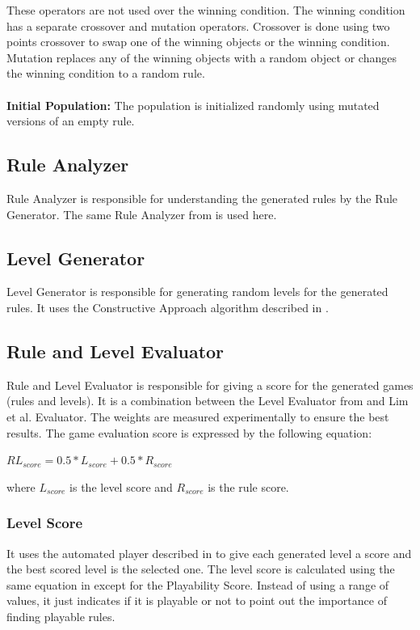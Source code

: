 These operators are not used over the winning condition. The winning condition has a separate crossover and mutation operators. Crossover is done using two points crossover to swap one of the winning objects or the winning condition. Mutation replaces any of the winning objects with a random object or changes the winning condition to a random rule.\\\\
\textbf{Initial Population:} The population is initialized randomly using mutated versions of an empty rule.

\subsection{Rule Analyzer}
Rule Analyzer is responsible for understanding the generated rules by the Rule Generator. The same Rule Analyzer from  is used here.

\subsection{Level Generator}
Level Generator is responsible for generating random levels for the generated rules. It uses the Constructive Approach algorithm described in .

\subsection{Rule and Level Evaluator}
Rule and Level Evaluator is responsible for giving a score for the generated games (rules and levels). It is a combination between the Level Evaluator from  and Lim et al.\cite{puzzleScriptGeneration} Evaluator. The weights are measured experimentally to ensure the best results. The game evaluation score is expressed by the following equation:
\begin{center}
$RL_{score} = 0.5 * L_{score} + 0.5 * R_{score}$
\end{center}
where $L_{score}$ is the level score and $R_{score}$ is the rule score.

\subsubsection{Level Score}
It uses the automated player described in  to give each generated level a score and the best scored level is the selected one. The level score is calculated using the same equation in  except for the Playability Score. Instead of using a range of values, it just indicates if it is playable or not to point out the importance of finding playable rules.

